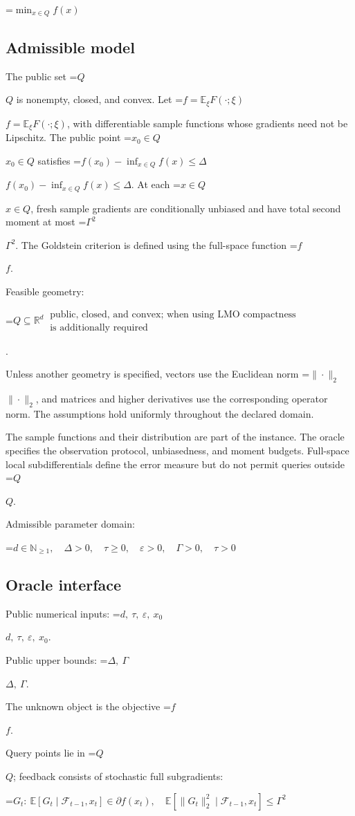 \documentclass[10pt,a4paper]{article}
\newcommand{\AtlasMath}[1]{\par\begingroup\centering\setbox0=\hbox{$\displaystyle #1$}\ifdim\wd0>1.4\linewidth\typeout{ATLAS WIDE FORMULA: \the\wd0}\fi\ifdim\wd0>\linewidth\resizebox{\linewidth}{!}{\box0}\else\box0\fi\par\endgroup}
\newcommand{\AtlasInlineMath}[1]{\begingroup\setbox0=\hbox{$#1$}\ifdim\wd0>.4\linewidth\endgroup\AtlasMath{#1}\else\endgroup$#1$\fi}
\begin{document}
\AtlasMath{\min_{x\in Q}f(x)}


\subsection{Admissible model}
The public set \AtlasInlineMath{Q} is nonempty, closed, and convex. Let \AtlasInlineMath{f=\mathbb E_\xi F(\cdot;\xi)}, with differentiable sample functions whose gradients need not be Lipschitz. The public point \AtlasInlineMath{x_0\in Q} satisfies \AtlasInlineMath{f(x_0)-\inf_{x\in Q}f(x)\le\Delta}. At each \AtlasInlineMath{x\in Q}, fresh sample gradients are conditionally unbiased and have total second moment at most \AtlasInlineMath{\Gamma^2}. The Goldstein criterion is defined using the full-space function \AtlasInlineMath{f}.

Feasible geometry: 
\AtlasMath{Q\subseteq\mathbb{R}^d\ \substack{\text{public, closed, and convex;  when using LMO compactness}\\\text{is additionally required}}}
.

Unless another geometry is specified, vectors use the Euclidean norm \AtlasInlineMath{\|\cdot\|_2}, and matrices and higher derivatives use the corresponding operator norm. The assumptions hold uniformly throughout the declared domain.

The sample functions and their distribution are part of the instance. The oracle specifies the observation protocol, unbiasedness, and moment budgets. Full-space local subdifferentials define the error measure but do not permit queries outside \AtlasInlineMath{Q}.

Admissible parameter domain:


\AtlasMath{d\in\mathbb{N}_{\ge1},\quad \Delta>0,\quad \tau\ge0,\quad \varepsilon>0,\quad \Gamma>0,\quad \tau>0}


\subsection{Oracle interface}
Public numerical inputs: \AtlasInlineMath{d,\ \tau,\ \varepsilon,\ x_0}.

Public upper bounds: \AtlasInlineMath{\Delta,\ \Gamma}.

The unknown object is the objective \AtlasInlineMath{f}.

Query points lie in \AtlasInlineMath{Q}; feedback consists of stochastic full subgradients:


\AtlasMath{G_t:\ \mathbb{E}[G_t\mid\mathcal{F}_{t-1},x_t]\in\partial f(x_t),\quad\mathbb{E}[\|G_t\|_2^2\mid\mathcal{F}_{t-1},x_t]\le\Gamma^2}
\end{document}
